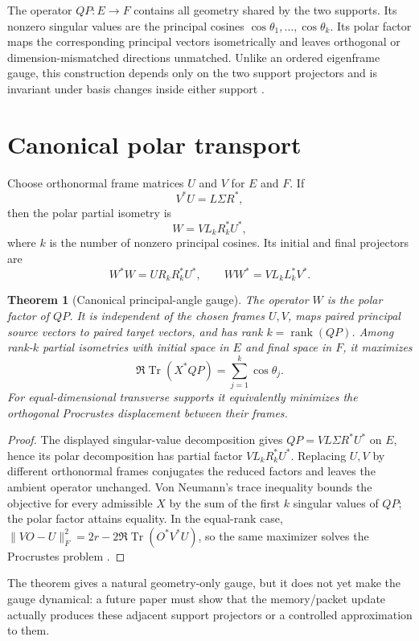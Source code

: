 \documentclass[12pt]{article}
\newtheorem{theorem}{Theorem}
\newcommand{\Tr}{\operatorname{Tr}}
\newcommand{\rank}{\operatorname{rank}}
\begin{document}
The operator $QP:E\to F$ contains all geometry shared by the two supports.
Its nonzero singular values are the principal cosines
$\cos\theta_1,\ldots,\cos\theta_k$.  Its polar factor maps the corresponding
principal vectors isometrically and leaves orthogonal or dimension-mismatched
directions unmatched.  Unlike an ordered eigenframe gauge, this construction
depends only on the two support projectors and is invariant under basis
changes inside either support \citep{Kato1995,Bhatia1997}.

\section{Canonical polar transport}
Choose orthonormal frame matrices $U$ and $V$ for $E$ and $F$.  If
\[
 V^*U=L\Sigma R^*,
\]
then the polar partial isometry is
\[
 W=V L_kR_k^*U^*,
\]
where $k$ is the number of nonzero principal cosines.  Its initial and final
projectors are
\[
 W^*W=U R_kR_k^*U^*,\qquad
 WW^*=V L_kL_k^*V^*.
\]

\begin{theorem}[Canonical principal-angle gauge]\label{thm:polar}
The operator $W$ is the polar factor of $QP$.  It is independent of the
chosen frames $U,V$, maps paired principal source vectors to paired target
vectors, and has rank $k=\rank(QP)$.  Among rank-$k$ partial isometries with
initial space in $E$ and final space in $F$, it maximizes
\[
 \Re\Tr(X^*QP)=\sum_{j=1}^k\cos\theta_j.
\]
For equal-dimensional transverse supports it equivalently minimizes the
orthogonal Procrustes displacement between their frames.
\end{theorem}

\begin{proof}
The displayed singular-value decomposition gives
$QP=VL\Sigma R^*U^*$ on $E$, hence its polar decomposition has partial
factor $V L_kR_k^*U^*$.  Replacing $U,V$ by different orthonormal frames
conjugates the reduced factors and leaves the ambient operator unchanged.
Von Neumann's trace inequality bounds the objective for every admissible
$X$ by the sum of the first $k$ singular values of $QP$; the polar factor
attains equality.  In the equal-rank case,
$\|VO-U\|_F^2=2r-2\Re\Tr(O^*V^*U)$, so the same maximizer solves the
Procrustes problem \citep{GolubVanLoan2013}.
\end{proof}

The theorem gives a natural geometry-only gauge, but it does not yet make
the gauge dynamical: a future paper must show that the memory/packet update
actually produces these adjacent support projectors or a controlled
approximation to them.
\end{document}
